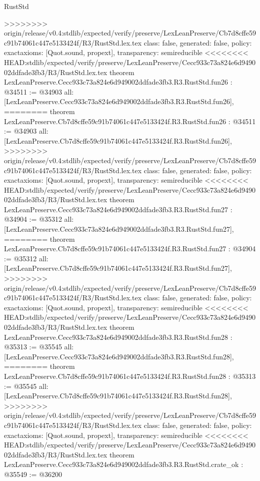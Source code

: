 \begin{lexlean}{RustStd}
\begin{coremodule}
{\begin{coremodule}
{{{{{{{{{{{{{{{{{{{{{{{{{{{{{>>>>>>>> origin/release/v0.4:stdlib/expected/verify/preserve/LexLeanPreserve/Cb7d8cffe59c91b74061c447e5133424f/R3/RustStd.lex.tex
  class: false,
  generated: false,
  policy: exact{axioms: [Quot.sound, propext]},
  transparency: semireducible
}
<<<<<<<< HEAD:stdlib/expected/verify/preserve/LexLeanPreserve/Cecc933c73a824e6d949002ddfade3fb3/R3/RustStd.lex.tex
theorem LexLeanPreserve.Cecc933c73a824e6d949002ddfade3fb3.R3.RustStd.fun26 : @34511 := @34903 {
  all: [LexLeanPreserve.Cecc933c73a824e6d949002ddfade3fb3.R3.RustStd.fun26],
========
theorem LexLeanPreserve.Cb7d8cffe59c91b74061c447e5133424f.R3.RustStd.fun26 : @34511 := @34903 {
  all: [LexLeanPreserve.Cb7d8cffe59c91b74061c447e5133424f.R3.RustStd.fun26],
>>>>>>>> origin/release/v0.4:stdlib/expected/verify/preserve/LexLeanPreserve/Cb7d8cffe59c91b74061c447e5133424f/R3/RustStd.lex.tex
  class: false,
  generated: false,
  policy: exact{axioms: [Quot.sound, propext]},
  transparency: semireducible
}
<<<<<<<< HEAD:stdlib/expected/verify/preserve/LexLeanPreserve/Cecc933c73a824e6d949002ddfade3fb3/R3/RustStd.lex.tex
theorem LexLeanPreserve.Cecc933c73a824e6d949002ddfade3fb3.R3.RustStd.fun27 : @34904 := @35312 {
  all: [LexLeanPreserve.Cecc933c73a824e6d949002ddfade3fb3.R3.RustStd.fun27],
========
theorem LexLeanPreserve.Cb7d8cffe59c91b74061c447e5133424f.R3.RustStd.fun27 : @34904 := @35312 {
  all: [LexLeanPreserve.Cb7d8cffe59c91b74061c447e5133424f.R3.RustStd.fun27],
>>>>>>>> origin/release/v0.4:stdlib/expected/verify/preserve/LexLeanPreserve/Cb7d8cffe59c91b74061c447e5133424f/R3/RustStd.lex.tex
  class: false,
  generated: false,
  policy: exact{axioms: [Quot.sound, propext]},
  transparency: semireducible
}
<<<<<<<< HEAD:stdlib/expected/verify/preserve/LexLeanPreserve/Cecc933c73a824e6d949002ddfade3fb3/R3/RustStd.lex.tex
theorem LexLeanPreserve.Cecc933c73a824e6d949002ddfade3fb3.R3.RustStd.fun28 : @35313 := @35545 {
  all: [LexLeanPreserve.Cecc933c73a824e6d949002ddfade3fb3.R3.RustStd.fun28],
========
theorem LexLeanPreserve.Cb7d8cffe59c91b74061c447e5133424f.R3.RustStd.fun28 : @35313 := @35545 {
  all: [LexLeanPreserve.Cb7d8cffe59c91b74061c447e5133424f.R3.RustStd.fun28],
>>>>>>>> origin/release/v0.4:stdlib/expected/verify/preserve/LexLeanPreserve/Cb7d8cffe59c91b74061c447e5133424f/R3/RustStd.lex.tex
  class: false,
  generated: false,
  policy: exact{axioms: [Quot.sound, propext]},
  transparency: semireducible
}
<<<<<<<< HEAD:stdlib/expected/verify/preserve/LexLeanPreserve/Cecc933c73a824e6d949002ddfade3fb3/R3/RustStd.lex.tex
theorem LexLeanPreserve.Cecc933c73a824e6d949002ddfade3fb3.R3.RustStd.crate_ok : @35549 := @36200 {
}}}}}}}}}}}}}}}}}}}}}}}}}}}}}}}}
\end{coremodule}}
\end{coremodule}
\end{lexlean}
